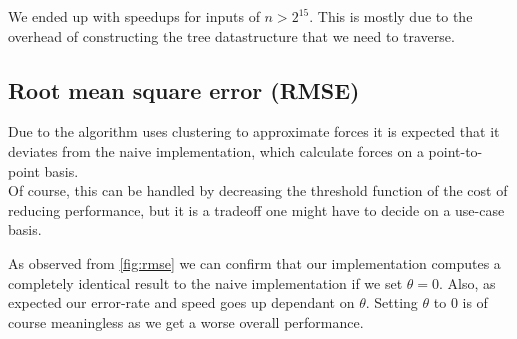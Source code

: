 We ended up with speedups for inputs of $n>2^{15}$.  This is mostly due to
the overhead of constructing the tree datastructure that we need to traverse.

\subsection{Root mean square error (RMSE)}
Due to the algorithm uses clustering to approximate forces it is expected that
it deviates from the naive implementation, which calculate forces on a
point-to-point basis.\\
Of course, this can be handled by decreasing the threshold function of the cost
of reducing performance, but it is a tradeoff one might have to decide on a
use-case basis.

\begin{Figure}
  \centering
  \label{fig:rmse}
\end{Figure}

As observed from \autoref{fig:rmse} we can confirm that our implementation
computes a completely identical result to the naive implementation if we set
$\theta = 0$. Also, as expected our error-rate and speed goes up dependant on
$\theta$. Setting $\theta$ to $0$ is of course meaningless as we get a worse
overall performance.

